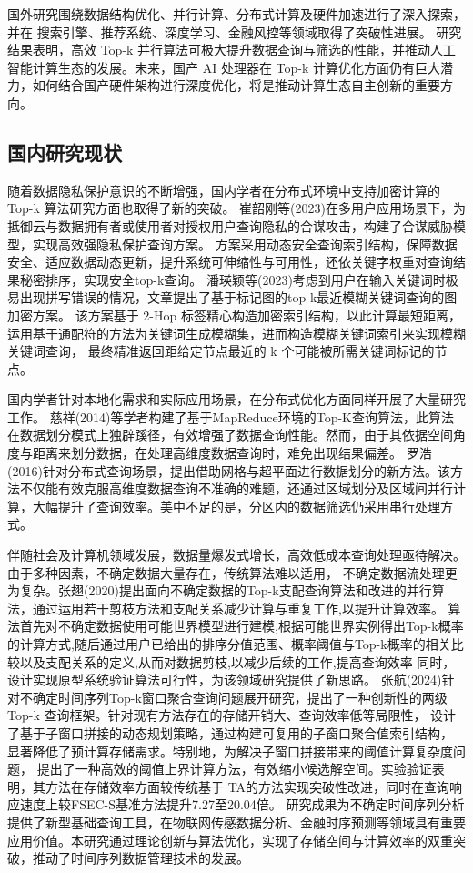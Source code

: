 国外研究围绕数据结构优化、并行计算、分布式计算及硬件加速进行了深入探索，并在 搜索引擎、推荐系统、深度学习、金融风控等领域取得了突破性进展。
研究结果表明，高效 Top-k 并行算法可极大提升数据查询与筛选的性能，并推动人工智能计算生态的发展。未来，国产 AI 处理器在 Top-k 计算优化方面仍有巨大潜力，如何结合国产硬件架构进行深度优化，将是推动计算生态自主创新的重要方向。



\subsection{国内研究现状}

随着数据隐私保护意识的不断增强，国内学者在分布式环境中支持加密计算的 Top-k 算法研究方面也取得了新的突破。
崔韶刚等(2023)在多用户应用场景下，为抵御云与数据拥有者或使用者对授权用户查询隐私的合谋攻击，构建了合谋威胁模型，实现高效强隐私保护查询方案。
方案采用动态安全查询索引结构，保障数据安全、适应数据动态更新，提升系统可伸缩性与可用性，还依关键字权重对查询结果秘密排序，实现安全top-k查询。
潘瑛颖等(2023)考虑到用户在输入关键词时极易出现拼写错误的情况，文章提出了基于标记图的top-k最近模糊关键词查询的图加密方案\cite{WXHK202311043}。
该方案基于 2-Hop 标签精心构造加密索引结构，以此计算最短距离，运用基于通配符的方法为关键词生成模糊集，进而构造模糊关键词索引来实现模糊关键词查询，
最终精准返回距给定节点最近的 k 个可能被所需关键词标记的节点。

国内学者针对本地化需求和实际应用场景，在分布式优化方面同样开展了大量研究工作。
慈祥(2014)等学者构建了基于MapReduce环境的Top-K查询算法，此算法在数据划分模式上独辟蹊径，有效增强了数据查询性能\cite{RJXB201404009}。然而，由于其依据空间角度与距离来划分数据，在处理高维度数据查询时，难免出现结果偏差。
罗浩(2016)针对分布式查询场景，提出借助网格与超平面进行数据划分的新方法\cite{1016325208.nh}。该方法不仅能有效克服高维度数据查询不准确的难题，还通过区域划分及区域间并行计算，大幅提升了查询效率。美中不足的是，分区内的数据筛选仍采用串行处理方式。 

伴随社会及计算机领域发展，数据量爆发式增长，高效低成本查询处理亟待解决。由于多种因素，不确定数据大量存在，传统算法难以适用，
不确定数据流处理更为复杂。张翅(2020)提出面向不确定数据的Top-k支配查询算法和改进的并行算法\cite{1020759080.nh}，通过运用若干剪枝方法和支配关系减少计算与重复工作,以提升计算效率。
算法首先对不确定数据使用可能世界模型进行建模,根据可能世界实例得出Top-k概率的计算方式,随后通过用户已给出的排序分值范围、概率阈值与Top-k概率的相关比较以及支配关系的定义,从而对数据剪枝,以减少后续的工作,提高查询效率
同时，设计实现原型系统验证算法可行性，为该领域研究提供了新思路。
张航(2024)针对不确定时间序列Top-k窗口聚合查询问题展开研究，提出了一种创新性的两级Top-k
查询框架\cite{JSJC20240614003}。针对现有方法存在的存储开销大、查询效率低等局限性，
设计了基于子窗口拼接的动态规划策略，通过构建可复用的子窗口聚合值索引结构，
显著降低了预计算存储需求。特别地，为解决子窗口拼接带来的阈值计算复杂度问题，
提出了一种高效的阈值上界计算方法，有效缩小候选解空间。实验验证表明，其方法在存储效率方面较传统基于
TA的方法实现突破性改进，同时在查询响应速度上较FSEC-S基准方法提升7.27至20.04倍。
研究成果为不确定时间序列分析提供了新型基础查询工具，在物联网传感数据分析、金融时序预测等领域具有重要应用价值。本研究通过理论创新与算法优化，实现了存储空间与计算效率的双重突破，推动了时间序列数据管理技术的发展。

